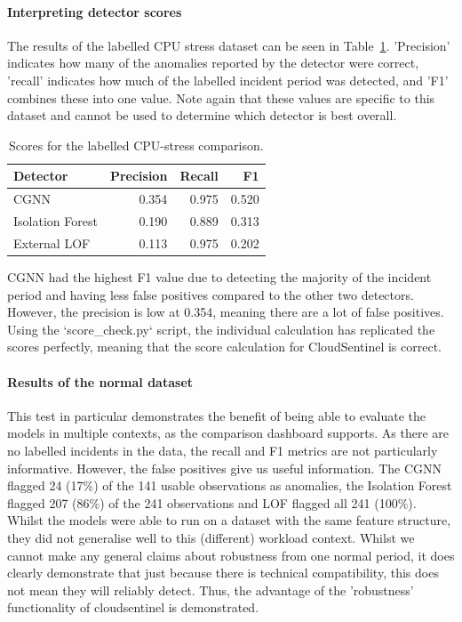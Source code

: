 \paragraph{Interpreting detector scores}
The results of the labelled CPU stress dataset can be seen in Table~\ref{tab:h9-functional-labelled-scores}. 'Precision' indicates how many of the anomalies reported by the detector were correct, 'recall' indicates how much of the labelled incident period was detected, and 'F1' combines these into one value. Note again that these values are specific to this dataset and cannot be used to determine which detector is best overall. 

\begin{table}[H]
    \centering
    \small
    \caption{Scores for the labelled CPU-stress comparison.}
    \label{tab:h9-functional-labelled-scores}
    \begin{tabular}{|l|r|r|r|}
        \hline
        Detector & Precision & Recall & F1 \\
        \hline
        CGNN & 0.354 & 0.975 & 0.520 \\
        Isolation Forest & 0.190 & 0.889 & 0.313 \\
        External LOF & 0.113 & 0.975 & 0.202 \\
        \hline
    \end{tabular}
\end{table}

CGNN had the highest F1 value due to detecting the majority of the incident period and having less false positives compared to the other two detectors. However, the precision is low at 0.354, meaning there are a lot of false positives. Using the `score\_check.py` script, the individual calculation has replicated the scores perfectly, meaning that the score calculation for CloudSentinel is correct.

\paragraph{Results of the normal dataset}
This test in particular demonstrates the benefit of being able to evaluate the models in multiple contexts, as the comparison dashboard supports. As there are no labelled incidents in the data, the recall and F1 metrics are not particularly informative. However, the false positives give us useful information. The CGNN flagged 24 (17\%) of the 141 usable observations as anomalies, the Isolation Forest flagged 207 (86\%) of the 241 observations and LOF flagged all 241 (100\%). Whilst the models were able to run on a dataset with the same feature structure, they did not generalise well to this (different) workload context. Whilst we cannot make any general claims about robustness from one normal period, it does clearly demonstrate that just because there is technical compatibility, this does not mean they will reliably detect. Thus, the advantage of the 'robustness' functionality of cloudsentinel is demonstrated.

